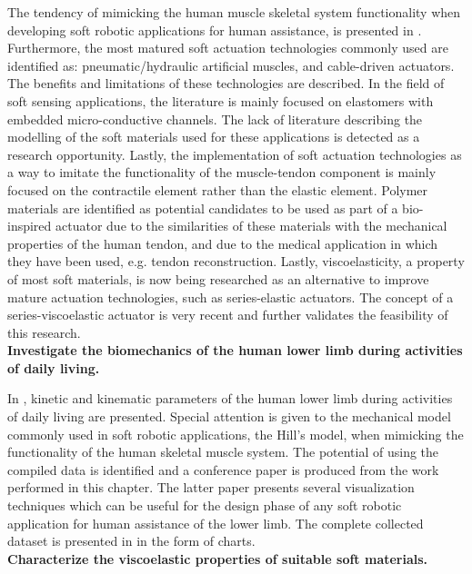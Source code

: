 The tendency of mimicking the human muscle skeletal system functionality when developing soft robotic applications for human assistance, is presented in . Furthermore, the most matured soft actuation technologies commonly used are identified as: pneumatic/hydraulic artificial muscles, and cable-driven actuators. The benefits and limitations of these technologies are described. In the field of soft sensing applications, the literature is mainly focused on elastomers with embedded micro-conductive channels. The lack of literature describing the modelling of the soft materials used for these applications is detected as a research opportunity. Lastly, the implementation of soft actuation technologies as a way to imitate the functionality of the muscle-tendon component is mainly focused on the contractile element rather than the elastic element. Polymer materials are identified as potential candidates to be used as part of a bio-inspired actuator due to the similarities of these materials with the mechanical properties of the human tendon, and due to the medical application in which they have been used, e.g. tendon reconstruction. Lastly, viscoelasticity, a property of most soft materials, is now being researched as an alternative to improve mature actuation technologies, such as series-elastic actuators. The concept of a series-viscoelastic actuator is very recent and further validates the feasibility of this research.
\\[1em]
\noindent \textbf{\large{  Investigate the biomechanics of the human lower limb during activities of daily living.}}

In , kinetic and kinematic parameters of the human lower limb during activities of daily living are presented. Special attention is given to the mechanical model commonly used in soft robotic applications, the Hill's model, when mimicking the functionality of the human skeletal muscle system. The potential of using the compiled data is identified and a conference paper is produced from the work performed in this chapter. The latter paper presents several visualization techniques which can be useful for the design phase of any soft robotic application for human assistance of the lower limb. The complete collected dataset is presented in  in the form of charts.
\\[1em]
\noindent \textbf{\large{ Characterize the viscoelastic properties of suitable soft materials.}}

